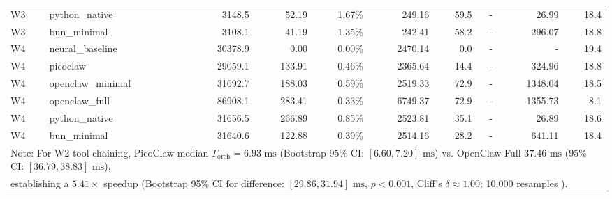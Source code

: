 \begin{table}[t]
\begin{tabular}{llrrrrrrrr}
W3 & python\_native & 3148.5 & 52.19 & 1.67\% & 249.16 & 59.5 & - & 26.99 & 18.4 \\
W3 & bun\_minimal & 3108.1 & 41.19 & 1.35\% & 242.41 & 58.2 & - & 296.07 & 18.8 \\
\midrule
W4 & neural\_baseline & 30378.9 & 0.00 & 0.00\% & 2470.14 & 0.0 & - & - & 19.4 \\
W4 & picoclaw & 29059.1 & 133.91 & 0.46\% & 2365.64 & 14.4 & - & 324.96 & 18.8 \\
W4 & openclaw\_minimal & 31692.7 & 188.03 & 0.59\% & 2519.33 & 72.9 & - & 1348.04 & 18.5 \\
W4 & openclaw\_full & 86908.1 & 283.41 & 0.33\% & 6749.37 & 72.9 & - & 1355.73 & 8.1 \\
W4 & python\_native & 31656.5 & 266.89 & 0.85\% & 2523.81 & 35.1 & - & 26.89 & 18.6 \\
W4 & bun\_minimal & 31640.6 & 122.88 & 0.39\% & 2514.16 & 28.2 & - & 641.11 & 18.4 \\
\midrule
\multicolumn{10}{l}{\footnotesize Note: For W2 tool chaining, PicoClaw median $T_{\text{orch}} = 6.93\text{ ms}$ (Bootstrap 95\% CI: $[6.60, 7.20]\text{ ms}$) vs. OpenClaw Full $37.46\text{ ms}$ (95\% CI: $[36.79, 38.83]\text{ ms}$),} \\
\multicolumn{10}{l}{\footnotesize establishing a $5.41\times$ speedup (Bootstrap 95\% CI for difference: $[29.86, 31.94]\text{ ms}$, $p < 0.001$, Cliff's $\delta \approx 1.00$; 10,000 resamples \cite{efron1979}).} \\
\bottomrule
\end{tabular}
\end{table}
